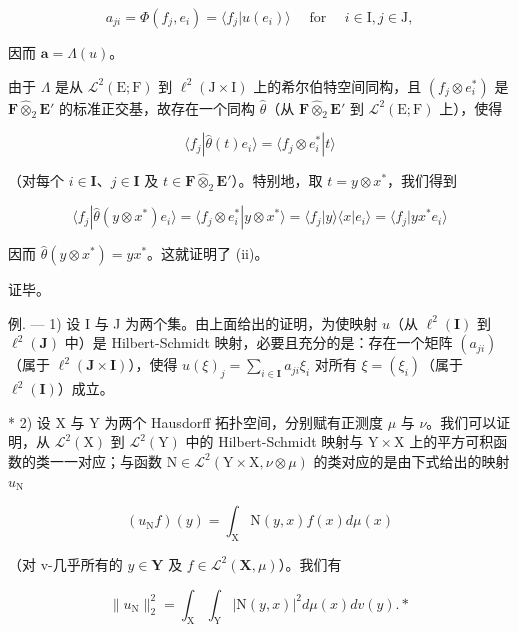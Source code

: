 \[
a _ {j i} = \Phi (f _ {j}, e _ {i}) = \langle f _ {j} | u (e _ {i}) \rangle \quad \text { for } \quad i \in \mathrm{I}, j \in \mathrm{J}  ,
\]

因而 \(\mathbf{a} = \Lambda(u)\)。

由于 \(\Lambda\) 是从 \(\mathcal{L}^2 (\mathrm{E};\mathrm{F})\) 到 \(\ell^2 (\mathrm{J}\times \mathrm{I})\) 上的希尔伯特空间同构，且 \((f_j\otimes e_i^*)\) 是 \(\mathbf{F}\hat{\otimes}_2\mathbf{E}'\) 的标准正交基，故存在一个同构 \(\hat{\theta}\)（从 \(\mathbf{F}\hat{\otimes}_2\mathbf{E}'\) 到 \(\mathcal{L}^2 (\mathrm{E};\mathrm{F})\) 上），使得

\[
\langle f _ {j} | \hat {\theta} (t) e _ {i} \rangle = \langle f _ {j} \otimes e _ {i} ^ {*} | t \rangle
\]

（对每个 \(i \in \mathbf{I}\)、\(j \in \mathbf{I}\) 及 \(t \in \mathbf{F} \hat{\otimes}_2 \mathbf{E}'\)）。特别地，取 \(t = y \otimes x^*\)，我们得到

\[
\langle f _ {j} | \hat {\theta} (y \otimes x ^ {*}) e _ {i} \rangle = \langle f _ {j} \otimes e _ {i} ^ {*} | y \otimes x ^ {*} \rangle = \langle f _ {j} | y \rangle \langle x | e _ {i} \rangle = \langle f _ {j} | y x ^ {*} e _ {i} \rangle
\]

因而 \(\hat{\theta}(y\otimes x^{*}) = yx^{*}\)。这就证明了 (ii)。

证毕。

例. --- 1) 设 I 与 J 为两个集。由上面给出的证明，为使映射 \(u\)（从 \(\ell^2(\mathbf{I})\) 到 \(\ell^2(\mathbf{J})\) 中）是 Hilbert-Schmidt 映射，必要且充分的是：存在一个矩阵 \((a_{ji})\)（属于 \(\ell^2(\mathbf{J} \times \mathbf{I})\)），使得 \(u(\xi)_j = \sum_{i \in \mathbf{I}} a_{ji} \xi_i\) 对所有 \(\xi = (\xi_i)\)（属于 \(\ell^2(\mathbf{I})\)）成立。

* 2) 设 X 与 Y 为两个 Hausdorff 拓扑空间，分别赋有正测度 \(\mu\) 与 \(\nu\)。我们可以证明，从 \(\mathcal{L}^2(\mathrm{X})\) 到 \(\mathcal{L}^2(\mathrm{Y})\) 中的 Hilbert-Schmidt 映射与 \(\mathrm{Y} \times \mathrm{X}\) 上的平方可积函数的类一一对应；与函数 \(\mathrm{N} \in \mathcal{L}^2(\mathrm{Y} \times \mathrm{X}, \nu \otimes \mu)\) 的类对应的是由下式给出的映射 \(u_{\mathrm{N}}\)

\[
(u _ {\mathrm{N}} f) (y) = \int_ {\mathrm{X}} \mathrm{N} (y, x) f (x) d \mu (x)\tag{38}
\]

（对 v-几乎所有的 \(y \in \mathbf{Y}\) 及 \(f \in \mathcal{L}^2(\mathbf{X}, \mu)\)）。我们有

\[
\| u _ {\mathrm{N}} \| _ {2} ^ {2} = \int_ {\mathrm{X}} \int_ {\mathrm{Y}} | \mathrm{N} (y, x) | ^ {2} d \mu (x) d v (y). *\tag{39}
\]

